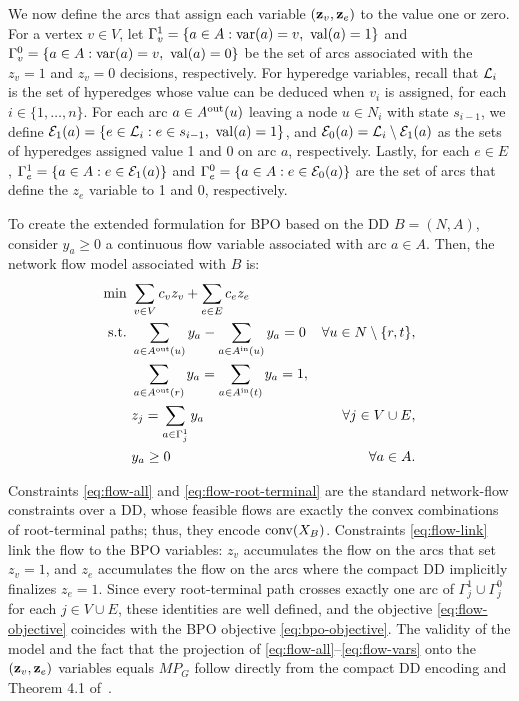We now define the arcs that assign each variable $(\mathbf{z}_v, \mathbf{z}_e)$ to the value one or zero. For a vertex $v\in V$, let $\Gamma_v^1=\{a\in A:\var(a)=v,\ \val(a)=1\}$ and $\Gamma_v^0=\{a\in A:\operatorname{var}(a)=v,\ \operatorname{val}(a)=0\}$ be the set of arcs associated with the $z_v = 1$ and $z_v = 0$ decisions, respectively. For hyperedge variables, recall that $\mathcal{L}_i$ is the set of hyperedges whose value can be deduced when $v_i$ is assigned, for each $i \in \{1,\ldots,n\}$. For each arc $a \in A^{\rm out}(u)$ leaving a node $u \in N_{i}$ with state $s_{i-1}$, we define
$
\mathcal{E}_1(a)=
\{e\in\mathcal{L}_i:e\in s_{i-1},\ \operatorname{val}(a)=1\}$,
and 
$\mathcal{E}_0(a)=\mathcal{L}_i\setminus\mathcal{E}_1(a)
$
as the sets of hyperedges assigned value 1 and 0 on arc $a$, respectively. Lastly, for each $e\in E$, $\Gamma_e^1=\{a\in A:e\in\mathcal{E}_1(a)\}$ and $\Gamma_e^0=\{a\in A:e\in\mathcal{E}_0(a)\}$ are the set of arcs that define the $z_e$ variable to 1 and 0, respectively. 

To create the extended formulation for BPO based on the DD $B=(N,A)$, consider $y_a\geq0$ a continuous flow variable associated with arc $a\in A$. Then, the network flow model associated with $B$ is:
%
\begin{subequations}\label{model:bpo-extended-dd}
\begin{align}
    \min\ & \sum_{v\in V} c_v z_v + \sum_{e\in E} c_e z_e \label{eq:flow-objective} \\
   \text{s.t.}\ & \sum_{a\in A^{\rm out}(u)} y_a - \sum_{a\in A^{\rm in}(u)} y_a = 0 & \forall u\in N\setminus\{r,t\}, \label{eq:flow-all}\\
   & \sum_{a\in A^{\rm out}(r)} y_a = \sum_{a\in A^{\rm in}(t)} y_a = 1, \label{eq:flow-root-terminal}\\
   & z_j = \sum_{a\in\Gamma_j^1} y_a & \forall j \in V\cup E, \label{eq:flow-link}\\
   & y_a \geq 0 & \forall a \in A. \label{eq:flow-vars}
\end{align}
\end{subequations}

Constraints \eqref{eq:flow-all} and \eqref{eq:flow-root-terminal} are the standard network-flow constraints over a DD, whose feasible flows are exactly the convex combinations of root-terminal paths; thus, they encode $\operatorname{conv}(X_B)$. Constraints \eqref{eq:flow-link} link the flow to the BPO variables: $z_v$ accumulates the flow on the arcs that set $z_v=1$, and $z_e$ accumulates the flow on the arcs where the compact DD implicitly finalizes $z_e=1$. Since every root-terminal path crosses exactly one arc of $\Gamma_j^1\cup\Gamma_j^0$ for each $j\in V\cup E$, these identities are well defined, and the objective \eqref{eq:flow-objective} coincides with the BPO objective \eqref{eq:bpo-objective}. The validity of the model and the fact that the projection of \eqref{eq:flow-all}--\eqref{eq:flow-vars} onto the $(\mathbf{z}_v,\mathbf{z}_e)$ variables equals $MP_G$ follow directly from the compact DD encoding and Theorem 4.1 of~\cite{behle2007}.
